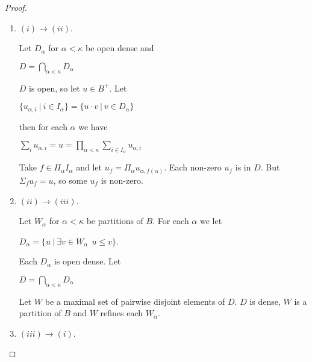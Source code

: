 \documentclass[8pt]{article}
\theoremstyle{definition}
\theoremstyle{definition}
\theoremstyle{definition}
\theoremstyle{definition}
\theoremstyle{definition}
\theoremstyle{definition}
\theoremstyle{definition}
\theoremstyle{definition}
\theoremstyle{definition}
\theoremstyle{definition}
\theoremstyle{definition}
\theoremstyle{definition}
\theoremstyle{definition}
\theoremstyle{definition}
\theoremstyle{question}
\begin{document}
\begin{proof}
  $ $

  \begin{enumerate}
    \item $(i) \to (ii)$.

    Let $D_{\alpha}$ for $\alpha < \kappa$ be open dense and 
    \begin{center}
    $D = \bigcap \limits_{\alpha < \kappa} D_{\alpha}$
    \end{center}
    $D$ is open, so let $u \in B^+$. Let
    \begin{center}
      $\{ u_{\alpha, i} \: | \: i \in I_{\alpha} \} = \{ u \cdot v \: | \: v \in D_{\alpha} \}$
    \end{center}
    then for each $\alpha$ we have
    \begin{center}
      $\sum \limits_{i} u_{\alpha, i} = u = \prod \limits_{\alpha < \kappa} \sum \limits_{i \in I_{\alpha}} u_{\alpha, i}$
    \end{center}
    Take $f \in \Pi_{\alpha} I_{\alpha}$ and let $u_f = \Pi_{\alpha} u_{\alpha, f(\alpha)}$. 
    Each non-zero $u_f$ is in $D$. But $\Sigma_f u_f = u$, so some $u_f$ is non-zero.
    \item $(ii) \to (iii)$.

    Let $W_{\alpha}$ for $\alpha < \kappa$ be partitions of $B$. For each $\alpha$ we let
    \begin{center}
      $D_{\alpha} = \{ u \: | \: \exists v \in W_{\alpha} \:\: u \leq v \}$.
    \end{center}
    Each $D_{\alpha}$ is open dense. Let
    \begin{center}
      $D = \bigcap \limits_{\alpha < \kappa} D_{\alpha}$
    \end{center}
    Let $W$ be a maximal set of pairwise disjoint elements of $D$. 
    $D$ is dense, $W$ is a partition of $B$ and $W$ refines each $W_{\alpha}$.
    \item $(iii) \to (i)$.


\end{enumerate}
\end{proof}
\end{document}
